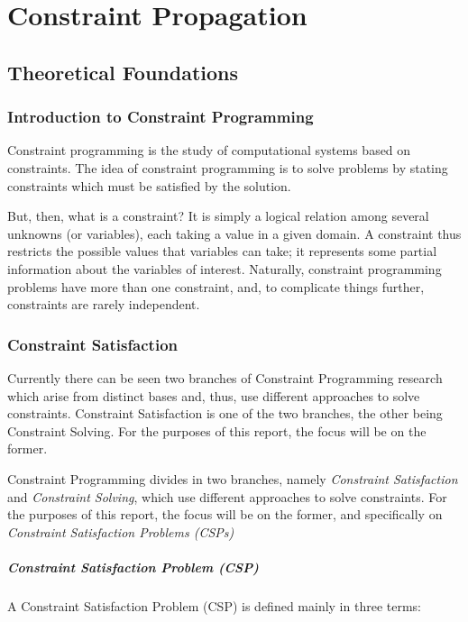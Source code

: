 \chapter{Constraint Propagation}

\section{Theoretical Foundations}

\subsection{Introduction to Constraint Programming}

Constraint programming is the study of computational systems based on constraints. The idea of constraint programming is to solve problems by stating constraints which must be satisfied by the solution.
\par
But, then, what is a constraint? It is simply a logical relation among several unknowns (or variables), each taking a value in a given domain. A constraint thus restricts the possible values that variables can take; it represents some partial information about the variables of interest.
Naturally, constraint programming problems have more than one constraint, and, to complicate things further, constraints are rarely independent.

\subsection{Constraint Satisfaction}

Currently there can be seen two branches of Constraint Programming research which arise from distinct bases and, thus, use different approaches to solve constraints. Constraint Satisfaction is one of the two branches, the other being Constraint Solving. For the purposes of this report, the focus will be on the former.

Constraint Programming divides in two branches, namely \textit{Constraint Satisfaction} and \textit{Constraint Solving}, which use different approaches to solve constraints. For the purposes of this report, the focus will be on the former, and specifically on \textit{Constraint Satisfaction Problems (CSPs)}

\paragraph{Constraint Satisfaction Problem (CSP)} A Constraint Satisfaction Problem (CSP) is defined mainly in three terms:

